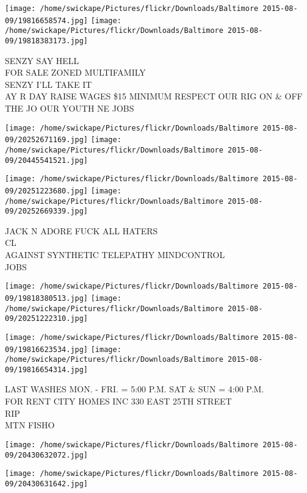 \documentclass[10pt,letterpaper]{article}
\begin{document}
\texttt{[image: /home/swickape/Pictures/flickr/Downloads/Baltimore 2015-08-09/19816658574.jpg]}
\texttt{[image: /home/swickape/Pictures/flickr/Downloads/Baltimore 2015-08-09/19818383173.jpg]}

SENZY SAY HELL\\
FOR SALE ZONED MULTIFAMILY\\
SENZY I'LL TAKE IT\\
AY R DAY RAISE WAGES \$15 MINIMUM RESPECT OUR RIG ON \& OFF THE JO OUR YOUTH NE JOBS\\
\pagebreak

\texttt{[image: /home/swickape/Pictures/flickr/Downloads/Baltimore 2015-08-09/20252671169.jpg]}
\texttt{[image: /home/swickape/Pictures/flickr/Downloads/Baltimore 2015-08-09/20445541521.jpg]}

\texttt{[image: /home/swickape/Pictures/flickr/Downloads/Baltimore 2015-08-09/20251223680.jpg]}
\texttt{[image: /home/swickape/Pictures/flickr/Downloads/Baltimore 2015-08-09/20252669339.jpg]}

JACK N ADORE FUCK ALL HATERS\\
CL\\
AGAINST SYNTHETIC TELEPATHY MINDCONTROL\\
JOBS\\
\pagebreak

\texttt{[image: /home/swickape/Pictures/flickr/Downloads/Baltimore 2015-08-09/19818380513.jpg]}
\texttt{[image: /home/swickape/Pictures/flickr/Downloads/Baltimore 2015-08-09/20251222310.jpg]}

\texttt{[image: /home/swickape/Pictures/flickr/Downloads/Baltimore 2015-08-09/19816623534.jpg]}
\texttt{[image: /home/swickape/Pictures/flickr/Downloads/Baltimore 2015-08-09/19816654314.jpg]}

LAST WASHES MON. {-} FRI. = 5:00 P.M. SAT \& SUN = 4:00 P.M.\\
FOR RENT CITY HOMES INC 330 EAST 25TH STREET\\
RIP\\
MTN FISHO\\
\pagebreak

\texttt{[image: /home/swickape/Pictures/flickr/Downloads/Baltimore 2015-08-09/20430632072.jpg]}

\vspace{0.25in}
\texttt{[image: /home/swickape/Pictures/flickr/Downloads/Baltimore 2015-08-09/20430631642.jpg]}
\end{document}
